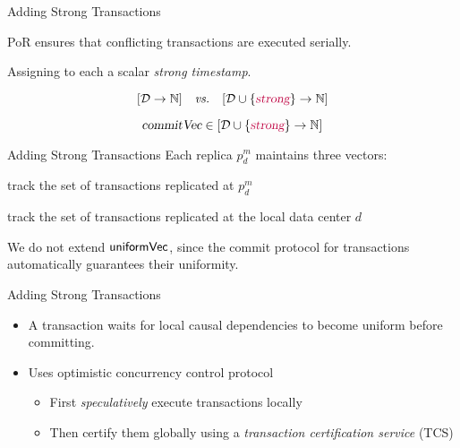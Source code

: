 
\begin{frame}{Adding Strong Transactions}
  \begin{center}
    PoR ensures that conflicting transactions are executed serially.

    \pause
    \vspace{0.50cm}
    Assigning to each  a scalar \emph{strong timestamp}.
  \end{center}

  \pause
  \vspace{0.30cm}
  \[
    [\mathcal{D} \to \mathbb{N}] \quad\text{\emph{vs.}}\quad [\mathcal{D} \cup \{\textcolor{purple}{\textsl{strong}}\} \to \mathbb{N}]
  \]

  \pause
  \[
    \textsl{commitVec} \in [\mathcal{D} \cup \{\textcolor{purple}{\textsl{strong}}\} \to \mathbb{N}]
  \]
\end{frame}

\begin{frame}{Adding Strong Transactions}
  Each replica $p^{m}_{d}$ maintains three vectors: \\[5pt]

  \begin{description}[<+->]
    \setlength{\itemsep}{10pt}
    \item[$\knownVC\text{[\strongcolor{\strongentry}]}$:] track the set of  transactions replicated at $p^{m}_{d}$
    \item[$\stableVC\text{[\strongcolor{\strongentry}]}$:] track the set of  transactions replicated at the local data center $d$
  \end{description}

  \pause
  \vspace{0.50cm}
  We do not extend ${\sf uniformVec}$, since the commit protocol for
   transactions automatically guarantees their uniformity.
\end{frame}

\begin{frame}{Adding Strong Transactions}
  \begin{itemize}[<+->]
    \setlength{\itemsep}{8pt}
    \item A  transaction waits for local causal dependencies to
          become uniform before committing.
    \item Uses optimistic concurrency control protocol \\[6pt]
          \begin{itemize}
            \setlength{\itemsep}{6pt}
            \item First \emph{speculatively} execute  transactions locally
            \item Then certify them globally using a \emph{transaction certification service}
                  (TCS)
          \end{itemize}
  \end{itemize}
\end{frame}

